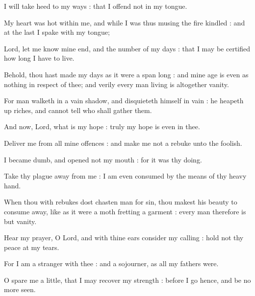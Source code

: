 
 I will take heed to my ways : that I offend not in my tongue.\par
{}
My heart was hot within me, and while I was thus musing the fire kindled : and at the last I spake with my tongue;\par
{}Lord, let me know mine end, and the number of my days : that I may be certified how long I have to live.\par
{}Behold, thou hast made my days as it were a span long : and mine age is even as nothing in respect of thee; and verily every man living is altogether vanity.\par
{}For man walketh in a vain shadow, and disquieteth himself in vain : he heapeth up riches, and cannot tell who shall gather them.\par
{}And now, Lord, what is my hope : truly my hope is even in thee.\par
{}Deliver me from all mine offences : and make me not a rebuke unto the foolish.\par
{}I became dumb, and opened not my mouth : for it was thy doing.\par
{}Take thy plague away from me : I am even consumed by the means of thy heavy hand.\par
{}When thou with rebukes dost chasten man for sin, thou makest his beauty to consume away, like as it were a moth fretting a garment : every man therefore is but vanity.\par
{}Hear my prayer, O Lord, and with thine ears consider my calling : hold not thy peace at my tears.\par
{}For I am a stranger with thee : and a sojourner, as all my fathers were.\par
{}O spare me a little, that I may recover my strength : before I go hence, and be no more seen.\par


